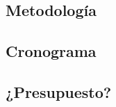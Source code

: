\documentclass{report}
\begin{document}
\subsection*{Metodología}

\subsection*{Cronograma}

\subsection*{¿Presupuesto?}




\printbibliography
\end{document}
